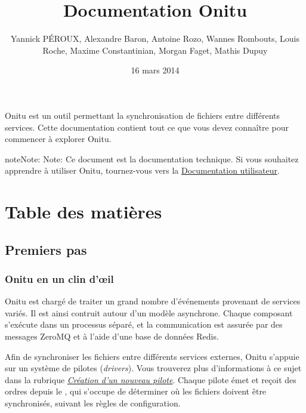 \documentclass[letterpaper,10pt,english]{sphinxmanual}
\title{Documentation Onitu}
\date{16 mars 2014}
\author{Yannick PÉROUX, Alexandre Baron, Antoine Rozo, Wannes Rombouts, Louis Roche, Maxime Constantinian, Morgan Faget, Mathis Dupuy}
\begin{document}
\maketitle
\tableofcontents
{}\label{index::doc}


Onitu est un outil permettant la synchronisation de fichiers entre différents services. Cette documentation contient tout ce que vous devez connaître pour commencer à explorer Onitu.

\begin{notice}{note}{Note:}
Note: Ce document est la documentation technique. Si vous souhaitez apprendre à utiliser Onitu, tournez-vous vers la \href{http://github.com/onitu/onitu}{Documentation utilisateur}.
\end{notice}


\chapter{Table des matières}
\label{index:onitu-version-technical-documentation}\label{index:content-table}\label{index:user-documentation}

\section{Premiers pas}
\label{intro:getting-started}\label{intro::doc}

\subsection{Onitu en un clin d'œil}
\label{intro:onitu-at-a-glance}
Onitu est chargé de traiter un grand nombre d'événements provenant de services variés. Il est ainsi contruit autour d'un modèle asynchrone. Chaque composant s'exécute dans un processus séparé, et la communication est assurée par des messages ZeroMQ et à l'aide d'une base de données Redis.

Afin de synchroniser les fichiers entre différents services externes, Onitu s'appuie sur un système de pilotes (\emph{drivers}). Vous trouverez plus d'informations à ce sujet dans la rubrique {\hyperref[drivers::doc]{\emph{Création d'un nouveau pilote}}}. Chaque pilote émet et reçoit des ordres depuis le {\hyperref[components:onitu.referee.Referee]{}}, qui s'occupe de déterminer où les fichiers doivent être synchronisés, suivant les règles de configuration.
\end{document}
